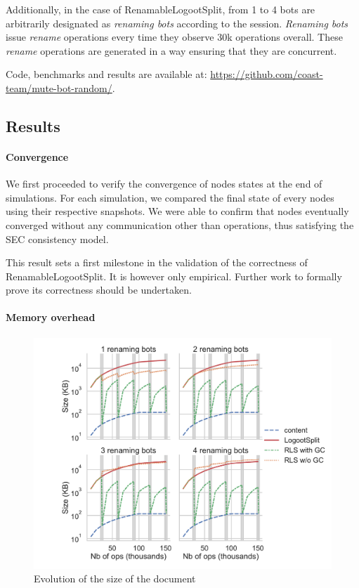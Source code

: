 \documentclass[sigplan,10pt]{acmart}
\begin{document}
Additionally, in the case of RenamableLogootSplit, from 1 to 4 bots are arbitrarily designated as \emph{renaming bots} according to the session.
\emph{Renaming bots} issue \emph{rename} operations every time they observe 30k operations overall.
These \emph{rename} operations are generated in a way ensuring that they are concurrent.

Code, benchmarks and results are available at: \url{https://github.com/coast-team/mute-bot-random/}.

\subsection{Results}

\paragraph{Convergence}

We first proceeded to verify the convergence of nodes states at the end of simulations.
For each simulation, we compared the final state of every nodes using their respective snapshots.
We were able to confirm that nodes eventually converged without any communication other than operations, thus satisfying the \ac{SEC} consistency model.

This result sets a first milestone in the validation of the correctness of RenamableLogootSplit.
It is however only empirical.
Further work to formally prove its correctness should be undertaken.

\paragraph{Memory overhead}

\begin{figure}[ht!]
    \centering
    \includegraphics[width=\columnwidth]{img/snapshot-sizes.pdf}
    \caption{Evolution of the size of the document}
    \label{fig:evolution-document-size}
\end{figure}
\end{document}
